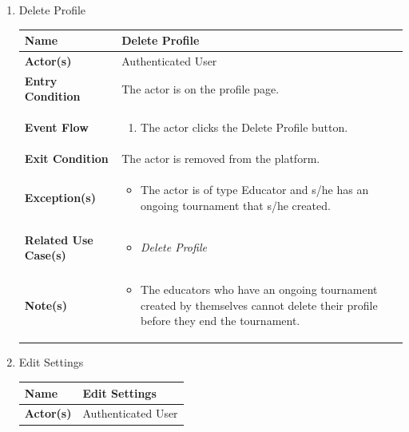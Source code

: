 \begin{enumerate}
\item Delete Profile
\begin{center}
    \begin{tabular}{ | m{10em} | m{10cm}| } 
      \hline
      \textbf{Name} & Delete Profile  \\ 
      \hline
      \textbf{Actor(s)} & Authenticated User \\ 
      \hline
      \textbf{Entry Condition} & The actor is on the profile page. \\ 
      \hline
      \textbf{Event Flow} & 
          \begin{enumerate}[(1)]
              \item The actor clicks the Delete Profile button.
          \end{enumerate}
      \\ 
      \hline
      \textbf{Exit Condition} & The actor is removed from the platform.  \\ 
      \hline
      \textbf{Exception(s)} & 
      \begin{itemize}
          \item The actor is of type Educator and s/he has an ongoing tournament that s/he created.
      \end{itemize}
          \\ 
      \hline
      \textbf{Related Use Case(s)} & 
      \begin{itemize}
          \item \textit{Delete Profile}
      \end{itemize}
          \\ 
      \hline
      \textbf{Note(s)} & 
      \begin{itemize}
          \item The educators who have an ongoing tournament created by themselves cannot delete their profile before they end the tournament.
      \end{itemize}
          \\ 
      \hline
    \end{tabular}
     \label{tbl:uc18}
\end{center}
\newpage
\item Edit Settings
\begin{center}
    \begin{tabular}{ | m{10em} | m{10cm}| } 
      \hline
      \textbf{Name} & Edit Settings  \\ 
      \hline
      \textbf{Actor(s)} & Authenticated User \\ 

\end{tabular}
\end{center}
\end{enumerate}
